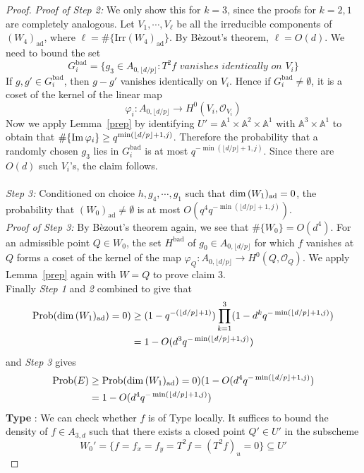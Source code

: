 \documentclass[12pt]{article}
\theoremstyle{plain}
\theoremstyle{definition}
\newcommand{\IA}{\mathbb{A}}
\newcommand{\sO}{\mathcal{O}}
\renewcommand\dim{{\rm dim\,}}
\newcommand{\im}{{\rm Im\,}}
\newcommand{\<}{\langle}
\renewcommand{\>}{\rangle}
\newcommand{\Prob}{\mathrm{Prob}}
\newcommand{\ad}{\mathrm{ad}}
\newcommand{\yk}{\lfloor d/p \rfloor}
\newcommand{\Irr}{\mathrm{Irr}}
\begin{document}
\begin{proof}
\textit{Proof of Step 2: }We only show this for $k = 3$, since the proofs for $k = 2, 1$ are completely analogous. Let $V_1, \cdots, V_\ell$ be all the irreducible components of $(W_4)_\ad$, where $\ell = \# \{\Irr (W_4)_\ad \}$. By B{\`e}zout's theorem, $\ell = O(d)$. We need to bound the set 
$$ G_i^{\mathrm{bad}} = \{ g_3 \in A_{0, \yk} : T^2 f \textit{ vanishes identically on }V_i \} $$ 
If $g, g' \in G_i^{\mathrm{bad}}$, then $g - g'$ vanishes identically on $V_i$. Hence if $G_i^{\mathrm{bad}} \neq \emptyset$, it is a coset of the kernel of the linear map 
$$ \varphi_i : A_{0, \yk} \to H^0(V_i, \sO_{V_i}) $$ 
Now we apply Lemma~\ref{prep} by identifying $U' = \IA^1 \times \IA^2 \times \IA^1$ with $\IA^3 \times \IA^1$ to obtain that $\# \{ \im \varphi_i \} \ge q^{\min(\yk + 1, j)}$. Therefore the probability that a randomly chosen $g_3$ lies in $G_i^{\mathrm{bad}}$ is at most  $q^{- \min(\yk + 1, j)}$. Since there are $O(d)$ such $V_i$'s, the claim follows. \\\\
\textit{Step 3: }Conditioned on choice $h, g_4, \cdots, g_1$ such that $\dim (W_1)_\ad = 0$, the probability that $(W_0)_\ad \neq \emptyset$ is at most $O(q^4 q^{- \min(\yk + 1, j)})$. \\
\textit{Proof of Step 3:} By B{\`e}zout's theorem again, we see that $\# \{ W_0 \} = O(d^4)$. For an admissible point $Q \in W_0$, the set $H^{\mathrm{bad}}$ of $g_0 \in A_{0, \yk}$ for which $f$ vanishes at $Q$ forms a coset of the kernel of the map $\varphi_Q : A_{0, \yk} \to H^0(Q, \sO_Q)$. We apply Lemma~\ref{prep} again with $W = Q$ to prove claim 3. \\
Finally \textit{Step 1} and \textit{2} combined to give that 
\begin{align*}
\Prob(\dim (W_1)_\ad) = 0) &\ge (1 - q^{-(\yk + 1)})\prod_{k = 1}^3 (1 - d^k q^{- \min(\yk + 1, j)}) \\
&= 1 - O(d^3 q^{- \min(\yk + 1, j)})
\end{align*}
and \textit{Step 3} gives 
\begin{align*}
\Prob(E) &\ge \Prob(\dim (W_1)_\ad) = 0)( 1 - O(d^4 q^{- \min(\yk + 1, j)}) \\ 
&= 1 - O(d^4 q^{- \min(\yk + 1, j)})
\end{align*}
\textbf{Type \uppercase\expandafter{}}: We can check whether $f$ is of Type \uppercase\expandafter{} locally. It suffices to bound the density of $f \in A_{3, d}$ such that there exists a closed point $Q' \in U'$ in the subscheme 
$$ W_0' = \{ f = f_x = f_y = T^2 f = (T^2 f)_u = 0 \} \subseteq U' $$

\end{proof}
\end{document}
